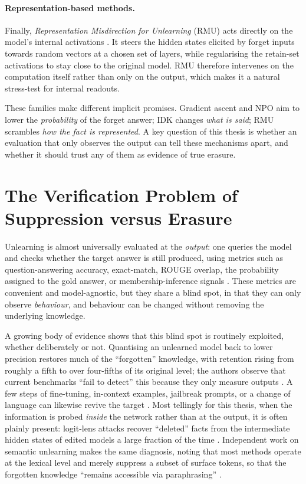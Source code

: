 \paragraph{Representation-based methods.}
Finally, \emph{Representation Misdirection for Unlearning} (RMU) acts directly on the model's internal
activations \citep{li2024wmdp}. It steers the hidden states elicited by forget inputs towards random
vectors at a chosen set of layers, while regularising the retain-set activations to stay close to the
original model. RMU therefore intervenes on the computation itself rather than only on the output, which
makes it a natural stress-test for internal readouts.

These families make different implicit promises. Gradient ascent and NPO aim to lower the \emph{probability}
of the forget answer; IDK changes \emph{what is said}; RMU scrambles \emph{how the fact is represented}. A
key question of this thesis is whether an evaluation that only observes the output can tell these mechanisms
apart, and whether it should trust any of them as evidence of true erasure.

\section{The Verification Problem of Suppression versus Erasure}
\label{sec:verification-problem}

Unlearning is almost universally evaluated at the \emph{output}: one queries the model and checks whether
the target answer is still produced, using metrics such as question-answering accuracy, exact-match, ROUGE
overlap, the probability assigned to the gold answer, or membership-inference signals
\citep{maini2024tofu,shi2024muse,li2024wmdp}. These metrics are convenient and model-agnostic, but they
share a blind spot, in that they can only observe \emph{behaviour}, and behaviour can be changed without
removing the underlying knowledge.

A growing body of evidence shows that this blind spot is routinely exploited, whether deliberately or not.
Quantising an unlearned model back to lower precision restores much of the ``forgotten'' knowledge, with
retention rising from roughly a fifth to over four-fifths of its original level; the authors observe that
current benchmarks ``fail to detect'' this because they only measure outputs \citep{zhang2024quantization}.
A few steps of fine-tuning, in-context examples, jailbreak prompts, or a change of language can likewise
revive the target \citep{lynch2024eight,fan2025relearn}. Most tellingly for this thesis, when the
information is probed \emph{inside} the network rather than at the output, it is often plainly present:
logit-lens attacks recover ``deleted'' facts from the intermediate hidden states of edited models a large
fraction of the time \citep{patil2023candelete}. Independent work on semantic unlearning makes the same
diagnosis, noting that most methods operate at the lexical level and merely suppress a subset of surface
tokens, so that the forgotten knowledge ``remains accessible via paraphrasing'' \citep{semantic2025unlearning}.

